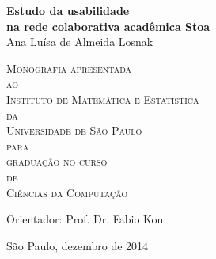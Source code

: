 \documentclass[11pt,twoside,a4paper]{book}
\begin{document}
\frontmatter 
\fancyhead[RO]{{\footnotesize\rightmark}\hspace{2em}\thepage}
\setcounter{tocdepth}{2}
\fancyhead[LE]{\thepage\hspace{2em}\footnotesize{\leftmark}}
\fancyhead[RE,LO]{}
\fancyhead[RO]{{\footnotesize\rightmark}\hspace{2em}\thepage}

\onehalfspacing  %

\thispagestyle{empty}
\begin{center}
    \vspace*{2.3cm}
    \textbf{\Large{Estudo da usabilidade \\
    na rede colaborativa acadêmica Stoa}}\\
    
    \vspace*{1.2cm}
    \Large{Ana Luísa de Almeida Losnak}
    
    \vskip 2cm
    \textsc{
    Monografia apresentada\\[-0.25cm] 
    ao\\[-0.25cm]
    Instituto de Matemática e Estatística\\[-0.25cm]
    da\\[-0.25cm]
    Universidade de São Paulo\\[-0.25cm]
    para\\[-0.25cm]
    graduação no curso\\[-0.25cm]
    de\\[-0.25cm]
    Ciências da Computação}
    
    \vskip 1.5cm
    Orientador: Prof. Dr. Fabio Kon
    
    \vskip 0.5cm
    \normalsize{São Paulo, dezembro de 2014}
\end{center}
\end{document}

